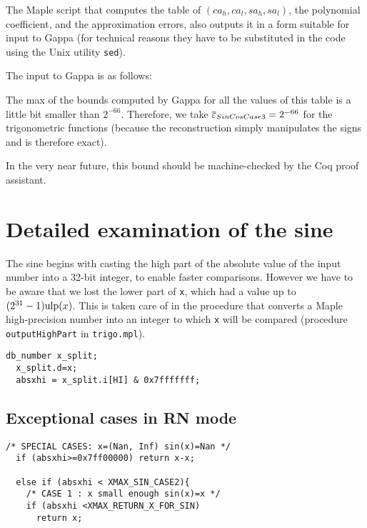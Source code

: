 The Maple script that computes the table of $(ca_h,ca_l,sa_h,sa_l)$,
the polynomial coefficient, and the approximation errors, also outputs
it in a form suitable for input to Gappa (for technical reasons they
have to be substituted in the code using the Unix utility
\texttt{sed}).

The input to Gappa is as follows:





The max of the bounds computed by Gappa for all the
values of this table is a little bit smaller than $2^{-66}$.
Therefore, we take ${\overline{\varepsilon}}_{SinCosCase3}=2^{-66}$ for the
trigonometric functions (because the reconstruction simply manipulates
the signs and is therefore exact).

In the very near future, this bound should be machine-checked by the
Coq proof assistant.



\section{Detailed examination of the sine}

The sine begins with casting the high part of the absolute value of
the input number into a 32-bit integer, to enable faster comparisons.
However we have to be aware that we lost the lower part of \texttt{x},
which had a value up to $(2^{31}-1)\mbox{ulp}(x)$. This is taken care of in
the procedure that converts a Maple high-precision number into an
integer to which \texttt{x} will be compared (procedure
\texttt{outputHighPart} in \texttt{trigo.mpl}).

\begin{lstlisting}[caption={Casting to an int for faster comparisons \label{lst:trigo:takehighpart}},firstnumber=1]
  db_number x_split;
  x_split.d=x;
  absxhi = x_split.i[HI] & 0x7fffffff;
\end{lstlisting}


\subsection{Exceptional cases in RN mode}
\begin{lstlisting}[caption={Exceptional cases for sine RN},firstnumber=1]
  /* SPECIAL CASES: x=(Nan, Inf) sin(x)=Nan */
  if (absxhi>=0x7ff00000) return x-x;

  else if (absxhi < XMAX_SIN_CASE2){
    /* CASE 1 : x small enough sin(x)=x */
    if (absxhi <XMAX_RETURN_X_FOR_SIN)
      return x;
\end{lstlisting}

